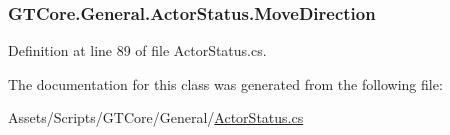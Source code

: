 \hypertarget{class_g_t_core_1_1_general_1_1_actor_status_a8b6609e98a371dbf2918ca249ff94d78}{}
\subsubsection[{Move\+Direction}]{ G\+T\+Core.\+General.\+Actor\+Status.\+Move\+Direction\hspace{0.3cm}{\ttfamily [get]}}\label{class_g_t_core_1_1_general_1_1_actor_status_a8b6609e98a371dbf2918ca249ff94d78}


Definition at line 89 of file Actor\+Status.\+cs.



The documentation for this class was generated from the following file\+:\begin{DoxyCompactItemize}
\item 
Assets/\+Scripts/\+G\+T\+Core/\+General/\hyperlink{_actor_status_8cs}{Actor\+Status.\+cs}\end{DoxyCompactItemize}
